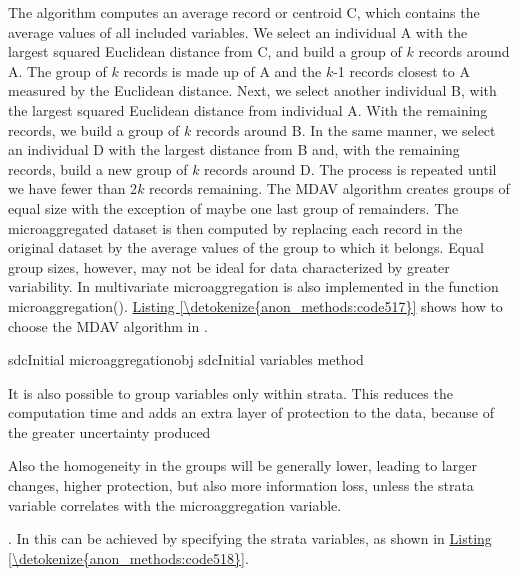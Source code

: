 \documentclass[letterpaper,10pt,english]{sphinxmanual}
\begin{document}
The algorithm computes an average record or centroid C, which contains
the average values of all included variables. We select an individual A
with the largest squared Euclidean distance from C, and build a group of
\(k\) records around A. The group of \(k\) records is made up of
A and the \(k\)-1 records closest to A measured by the Euclidean
distance. Next, we select another individual B, with the largest squared
Euclidean distance from individual A. With the remaining records, we
build a group of \(k\) records around B. In the same manner, we
select an individual D with the largest distance from B and, with the
remaining records, build a new group of \(k\) records around D. The
process is repeated until we have fewer than 2\(k\) records
remaining. The MDAV algorithm creates groups of equal size with the
exception of maybe one last group of remainders. The microaggregated
dataset is then computed by replacing each record in the original
dataset by the average values of the group to which it belongs. Equal
group sizes, however, may not be ideal for data characterized by greater
variability. In  multivariate microaggregation is also
implemented in the function microaggregation(). \hyperref[\detokenize{anon_methods:code517}]{Listing \ref{\detokenize{anon_methods:code517}}} shows how
to choose the MDAV algorithm in .

\def\sphinxLiteralBlockLabel{\label{\detokenize{anon_methods:code517}}}
%
\begin{sphinxVerbatim}[commandchars=\\\{\},numbers=left,firstnumber=1,stepnumber=1]
   sdcInitial  microaggregationobj  sdcInitial variables     method  
\end{sphinxVerbatim}

It is also possible to group variables only within strata. This reduces
the computation time and adds an extra layer of protection to the data,
because of the greater uncertainty produced %
\begin{footnote}[17]\sphinxAtStartFootnote
Also the homogeneity in the groups will be generally lower, leading
to larger changes, higher protection, but also more information loss,
unless the strata variable correlates with the microaggregation
variable.
%
\end{footnote}. In
 this can be achieved by specifying the strata variables, as
shown in \hyperref[\detokenize{anon_methods:code518}]{Listing \ref{\detokenize{anon_methods:code518}}}.
\end{document}
